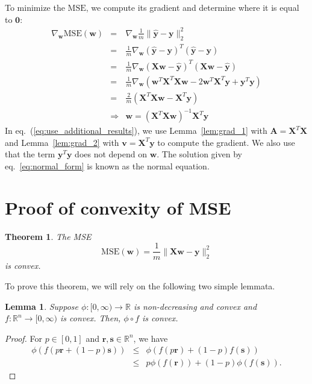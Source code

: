 \documentclass[12pt]{article}
\newtheorem{thm}{Theorem}
\newtheorem{lem}{Lemma}
\newcommand{\R}{\mathbb{R}}
\newcommand{\X}{\boldsymbol{X}}
\newcommand{\y}{\boldsymbol{y}}
\newcommand{\yh}{\hat{\boldsymbol{y}}}
\newcommand{\w}{\boldsymbol{w}}
\newcommand{\A}{\boldsymbol{A}}
\newcommand{\mse}{\mathrm{MSE}}
\begin{document}
To minimize the $\mse$, we compute its gradient and determine where it is equal to $\boldsymbol{0}$:
\begin{eqnarray}
\nabla_{\w} \mse (\w) 
& = & 
\nabla_{\w}  \frac{1}{m} \| \yh - \y \|^2_2 \\ 
& = & 
\frac{1}{m} \nabla_{\w}  (\yh - \y)^T (\yh - \y) \\
& = & 
\frac{1}{m} \nabla_{\w}  (\X \w - \yh)^T (\X \w - \yh) \\
& = &
\frac{1}{m} \nabla_{\w} ( \w^T \X^T \X \w - 2 \w^T \X^T \y + \y^T \y) \label{eq:use_additional_results} \\ 
& = &
\frac{2}{m} (\X^T \X \w - \X^T \y)  \\
& \Longrightarrow & 
\w = (\X^T \X \w)^{-1} \X^T \y \label{eq:normal_form}
\end{eqnarray}
In eq.~(\ref{eq:use_additional_results}), we use Lemma~\ref{lem:grad_1} with $\A = \X^T \X$ and Lemma~\ref{lem:grad_2} with $\boldsymbol{v}=\X^T \y$ to compute the
gradient. We also use that the term $\y^T \y$ does not depend on $\w$. The solution given by eq.~\ref{eq:normal_form} is known as the normal equation.

\section{Proof of convexity of MSE}

\begin{thm}
The MSE
\[
\mse(\w) 
 = 
\frac{1}{m} \| \X \w - \y \|_2^2
\]
is convex.
\end{thm}

To prove this theorem, we will rely on the following two simple lemmata.

\begin{lem}
Suppose $\phi : [0,\infty) \rightarrow \R$ is non-decreasing and convex and $f : \R^n \rightarrow [0,\infty)$ is convex. 
Then, $\phi\circ f$ is convex.
\end{lem}
\begin{proof}
For $p\in [0,1]$ and $\boldsymbol{r},\boldsymbol{s}\in\R^n$, we have
\begin{eqnarray*}
\phi( f(p \boldsymbol{r} + (1-p) \boldsymbol{s})) & \le & \phi( f(p \boldsymbol{r}) + (1-p) f(\boldsymbol{s})) \\
& \le & 
p \phi( f(\boldsymbol{r})) + (1-p) \phi(f(\boldsymbol{s})).
\end{eqnarray*}
\end{proof}
\end{document}
